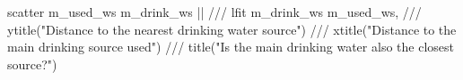 scatter m_used_ws m_drink_ws  || ///
lfit m_drink_ws m_used_ws, ///
        ytitle("Distance to the nearest drinking water source") ///
        xtitle("Distance to the main drinking source used") ///
        title("Is the main drinking water also the closest source?")
